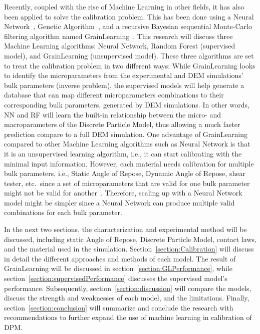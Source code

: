Recently, coupled with the rise of Machine Learning in other fields, it has also been applied to solve the calibration problem. This has been done using a Neural Network~\cite{nn-calibration, NN-GA, NN-coarse, YE2019292}, Genetic Algorithm~\cite{ga-calibration}, and a recursive Bayesian sequential Monte-Carlo filtering algorithm named GrainLearning~\cite{grainLearning}. This research will discuss three Machine Learning algorithms: Neural Network, Random Forest (supervised model), and GrainLearning (unsupervised model). These three algorithms are set to treat the calibration problem in two different ways: While GrainLearning looks to identify the microparameters from the experimental and DEM simulations' bulk parameters (inverse problem), the supervised models will help generate a database that can map different microparameters combinations to their corresponding bulk parameters, generated by DEM simulations. In other words, NN and RF will learn the built-in relationship between the micro- and macroparameters of the Discrete Particle Model, thus allowing a much faster prediction compare to a full DEM simulation. One advantage of GrainLearning compared to other Machine Learning algorithms such as Neural Network is that it is an unsupervised learning algorithm, i.e., it can start calibrating with the minimal input information. However, each material needs calibration for multiple bulk parameters, i.e., Static Angle of Repose, Dynamic Angle of Repose, shear tester, etc.~since a set of microparameters that are valid for one bulk parameter might not be valid for another~\cite{reviewCalibration}. Therefore, scaling up with a Neural Network model might be simpler since a Neural Network can produce multiple valid combinations for each bulk parameter. 

In the next two sections, the characterization and experimental method will be discussed, including static Angle of Repose, Discrete Particle Model, contact laws, and the material used in the simulation. Section~\ref{section:Calibration} will discuss in detail the different approaches and methods of each model. The result of GrainLearning will be discussed in section~\ref{section:GLPerformance}, while section~\ref{section:supervisedPerformance} discusses the supervised model's performance. Subsequently, section~\ref{section:discussion} will compare the models, discuss the strength and weaknesses of each model, and the limitations. Finally, section~\ref{section:conclusion} will summarize and conclude the research with recommendations to further expand the use of machine learning in calibration of DPM.


